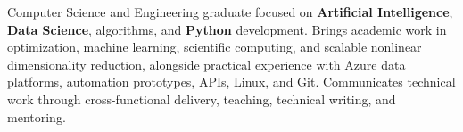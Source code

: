 \begin{cvparagraph}
  Computer Science and Engineering graduate focused on \textbf{Artificial Intelligence}, \textbf{Data Science}, algorithms, and \textbf{Python} development. Brings academic work in optimization, machine learning, scientific computing, and scalable nonlinear dimensionality reduction, alongside practical experience with Azure data platforms, automation prototypes, APIs, Linux, and Git. Communicates technical work through cross-functional delivery, teaching, technical writing, and mentoring.
\end{cvparagraph}
